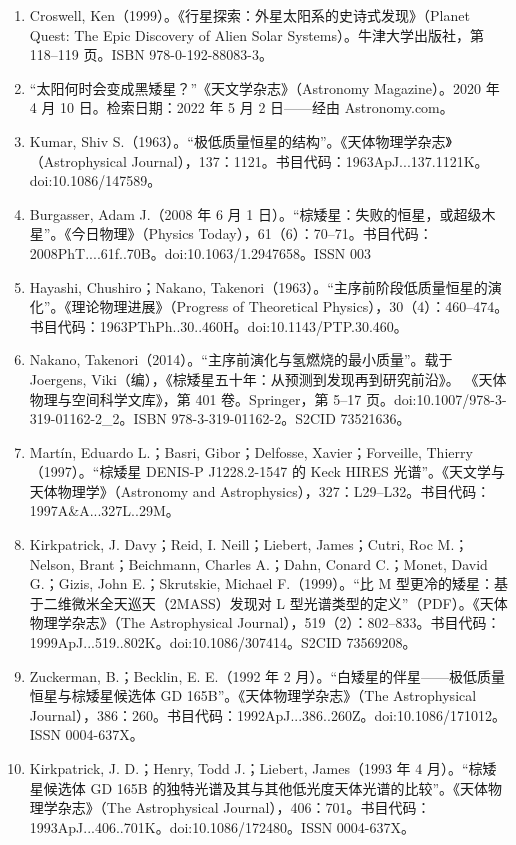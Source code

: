 \begin{enumerate}
\item Croswell, Ken（1999）。《行星探索：外星太阳系的史诗式发现》（Planet Quest: The Epic Discovery of Alien Solar Systems）。牛津大学出版社，第 118–119 页。ISBN 978-0-192-88083-3。
\item “太阳何时会变成黑矮星？”《天文学杂志》（Astronomy Magazine）。2020 年 4 月 10 日。检索日期：2022 年 5 月 2 日——经由 Astronomy.com。
\item Kumar, Shiv S.（1963）。“极低质量恒星的结构”。《天体物理学杂志》（Astrophysical Journal），137：1121。书目代码：1963ApJ...137.1121K。doi:10.1086/147589。
\item Burgasser, Adam J.（2008 年 6 月 1 日）。“棕矮星：失败的恒星，或超级木星”。《今日物理》（Physics Today），61（6）：70–71。书目代码：2008PhT....61f..70B。doi:10.1063/1.2947658。ISSN 003
\item Hayashi, Chushiro；Nakano, Takenori（1963）。“主序前阶段低质量恒星的演化”。《理论物理进展》（Progress of Theoretical Physics），30（4）：460–474。书目代码：1963PThPh..30..460H。doi:10.1143/PTP.30.460。
\item Nakano, Takenori（2014）。“主序前演化与氢燃烧的最小质量”。载于 Joergens, Viki（编），《棕矮星五十年：从预测到发现再到研究前沿》。 《天体物理与空间科学文库》，第 401 卷。Springer，第 5–17 页。doi:10.1007/978-3-319-01162-2_2。ISBN 978-3-319-01162-2。S2CID 73521636。
\item Martín, Eduardo L.；Basri, Gibor；Delfosse, Xavier；Forveille, Thierry（1997）。“棕矮星 DENIS-P J1228.2-1547 的 Keck HIRES 光谱”。《天文学与天体物理学》（Astronomy and Astrophysics），327：L29–L32。书目代码：1997A&A...327L..29M。
\item Kirkpatrick, J. Davy；Reid, I. Neill；Liebert, James；Cutri, Roc M.；Nelson, Brant；Beichmann, Charles A.；Dahn, Conard C.；Monet, David G.；Gizis, John E.；Skrutskie, Michael F.（1999）。“比 M 型更冷的矮星：基于二维微米全天巡天（2MASS）发现对 L 型光谱类型的定义”（PDF）。《天体物理学杂志》（The Astrophysical Journal），519（2）：802–833。书目代码：1999ApJ...519..802K。doi:10.1086/307414。S2CID 73569208。
\item Zuckerman, B.；Becklin, E. E.（1992 年 2 月）。“白矮星的伴星——极低质量恒星与棕矮星候选体 GD 165B”。《天体物理学杂志》（The Astrophysical Journal），386：260。书目代码：1992ApJ...386..260Z。doi:10.1086/171012。ISSN 0004-637X。
\item Kirkpatrick, J. D.；Henry, Todd J.；Liebert, James（1993 年 4 月）。“棕矮星候选体 GD 165B 的独特光谱及其与其他低光度天体光谱的比较”。《天体物理学杂志》（The Astrophysical Journal），406：701。书目代码：1993ApJ...406..701K。doi:10.1086/172480。ISSN 0004-637X。

\end{enumerate}

